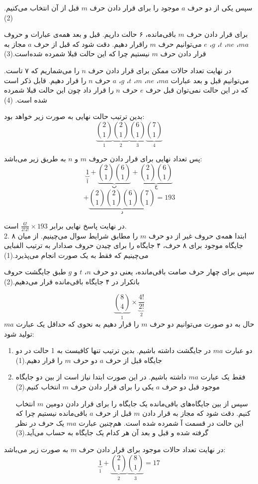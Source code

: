 \begin{enumerate}
      \p
      سپس یکی از دو حرف $a$ موجود را برای قرار دادن حرف $m$ قبل از آن انتخاب می‌کنیم.(2)
      
      \p
      برای قرار دادن حرف $m$ باقی‌مانده، ۶ حالت داریم.
      قبل و بعد همه‌ی عبارات و حروف 
      $ma$، $ne$، $t$، $g$، $e$
      می‌توانیم حرف $m$ راقرار دهیم.
      دقت شود که قبل از حرف $a$ مجاز به قرار دادن حرف $m$ نیستیم چرا که این حالت قبلا شمرده شده‌است.(3)
      
      \p
      در نهایت تعداد حالات ممکن برای قرار دادن حرف $n$ را
      می‌شماریم که ۷ تاست. می‌توانیم قبل و بعد عبارات
      $ma$،
      $ne$،
      $m$،
      $t$، $g$، $a$
      حرف $n$ را قرار دهیم.
      قابل ذکر است که در این حالت نمی‌توان قبل حرف $e$
      حرف $n$ را قرار داد چون این حالت قبلا شمرده شده است.
      (4)
      
      \p
      بدین ترتیب حالت نهایی به صورت زیر خواهد بود:
      $$\underbrace{{2\choose 1}}_{1}\underbrace{{2\choose 1}}_{2}\underbrace{{6\choose 1}}_{3}\underbrace{{7\choose 1}}_{4}$$
    \end{enumerate}
    \p
    پس تعداد نهایی برای قرار دادن حروف $m$ و $n$ به طریق زیر می‌باشد:
    $$\underbrace{1}_{\text{آ}} + \underbrace{{2 \choose 1}{6\choose 1}}_{\text{ب}} + \underbrace{{2\choose 1}{6\choose 1}}_{\text{ج}}$$
    $$+ \underbrace{{2\choose 1}{2\choose 1}{6\choose 1}{7\choose 1}}_{\text{د}} = 193$$

    در نهایت پاسخ نهایی برابر $\frac{6!}{2!2!} \times 193$ است.
    \\2.
    \p
    ابتدا همه‌ی حروف غیر از دو حرف $m$ را مطابق شرایط سوال می‌چینیم.
    از میان ۸ جایگاه موجود برای ۸ حرف، ۴ جایگاه را برای چیدن حروف صدادار به ترتیب الفبایی می‌چینیم که فقط به یک صورت انجام می‌پذیرد.(1)
    
    \p
    سپس برای چهار حرف صامت باقی‌مانده، یعنی دو حرف 
    $n$،
    $t$ و $g$
    طبق جایگشت حروف باتکرار در ۴ جایگاه باقی‌مانده قرار می‌دهیم.(2)
    
    $$\underbrace{{8\choose 4}}_{1} \times \underbrace{\frac{4!}{2!}}_{2}$$
    حال به دو صورت می‌توانیم دو حرف $m$ را قرار دهیم به نحوی که حداقل یک عبارت 
    $ma$ تولید شود:
    \begin{enumerate}
      \item 
      \p
      دو عبارت $ma$ در جایگشت داشته باشیم. بدین ترتیب تنها کافیست به 1 حالت در دو جایگاه قبل از حرف $a$ دو حرف $m$ را قرار دهیم.(1)
      \item
      \p
      فقط یک عبارت $ma$ داشته‌ باشیم. در این صورت ابتدا نیاز است از بین دو جایگاه موجود قبل دو حرف $a$ یکی را برای قرار دادن حرف $m$ انتخاب کنیم.(2)
      
      \p
      سپس از بین جایگاه‌های باقی‌مانده یک جایگاه را برای قرار دادن دومین $m$ انتخاب کنیم. دقت شود که مجاز به قرار دادن $m$ قبل از حرف $a$ باقی‌مانده نیستیم چرا که این حالت در قسمت آ شمرده شده است. هم‌چنین عبارت $ma$ یک حرف در نظر گرفته شده و قبل و بعد آن هر کدام یک جایگاه به حساب می‌آید.(3)
    \end{enumerate}
    \p
    در نهایت تعداد حالات موجود برای قرار دادن حرف $m$ به صورت زیر می‌باشد:
    $$\underbrace{1}_{1} + \underbrace{2\choose 1}_{2}\underbrace{8\choose 1}_{3} = 17$$
    
